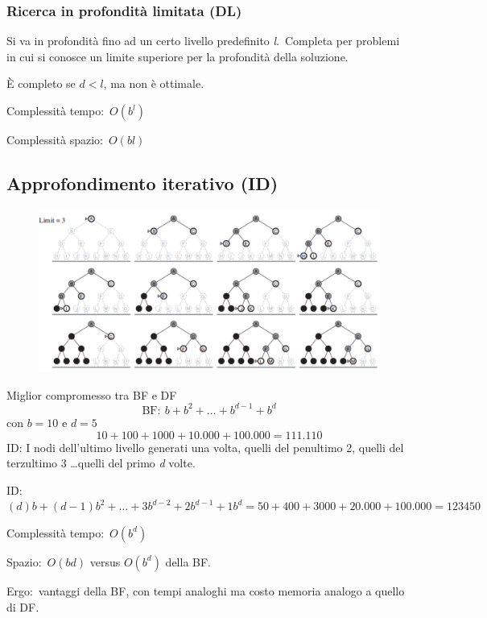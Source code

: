 \subsubsection{Ricerca in profondità limitata (DL)}
Si va in profondità fino ad un certo livello predefinito \textit{l}.\
Completa per problemi in cui si conosce un limite superiore per la profondità della soluzione.

È completo se $d < l$, ma non è ottimale.\
\begin{center}
	Complessità tempo:\ $O(b^l)$

	Complessità spazio:\ $O(bl)$
\end{center}

\subsection{Approfondimento iterativo (ID)}

\begin{figure}[H]
	\centering
	\includegraphics[width=\textwidth]{immagini/Approfondimento_iterativo.png}
\end{figure}

Miglior compromesso tra BF e DF
\[\mathrm{BF}:\ b+b^2+ \dots +b^{d-1}+b^d\]
con $b=10$ e $d=5$
\[10+100+1000+10.000+100.000=111.110\]
ID: I nodi dell'ultimo livello generati una volta, quelli del penultimo 2, quelli del terzultimo 3 \dots quelli del primo \textit{d} volte.
\begin{center}
	ID:\ $(d)b+(d-1) b^2+ \dots +3b^{d-2}+2b^{d-1}+1b^d = 50+400+3000+20.000+100.000=123450$
\end{center}
\begin{center}
	Complessità tempo:\ $O(b^d)$

	Spazio:\ $O(bd)$ versus $O(b^d)$ della BF.
\end{center}
Ergo:\ vantaggi della BF, con tempi analoghi ma costo memoria analogo a quello di DF.

